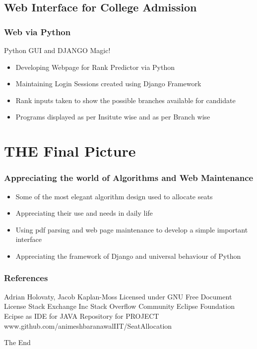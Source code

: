 \documentclass{beamer}
\begin{document}
\subsection{Web Interface for College Admission }

\begin{frame}
\frametitle{Web via Python}
Python GUI and DJANGO Magic!
\begin{itemize}
\item Developing Webpage for Rank Predictor via Python \pause
\item Maintaining Login Sessions created using Django Framework \pause
\item Rank inputs taken to show the possible branches available for candidate \pause
\item Programs displayed as per Insitute wise and as per Branch wise \pause
\end{itemize}

\end{frame}

\section {THE Final Picture}

\begin{frame}
\frametitle{Appreciating the world of Algorithms and Web Maintenance}

\begin{itemize}
\item Some of the most elegant algorithm design used to allocate seats \pause
\item Appreciating their use and needs in daily life \pause
\item Using pdf parsing and web page maintenance to develop a simple important interface \pause
\item Appreciating the framework of Django and universal behaviour of Python \pause
\end{itemize}

\end{frame}




\begin{frame}
\frametitle{References}
\footnotesize{
\begin{thebibliography}{99} %
 Adrian Holovaty, Jacob Kaplan-Moss
\newblock Licensed under GNU Free Document License 
 Stack Exchange Inc
\newblock Stack Overflow Community
 Eclipse Foundation
\newblock Ecipse as IDE for JAVA
 Repository for PROJECT
\newblock www.github.com/animeshbaranawalIIT/SeatAllocation
\end{thebibliography}
}
\end{frame}


\begin{frame}
\Huge{\centerline{The End}}
\end{frame}

\end{document}
